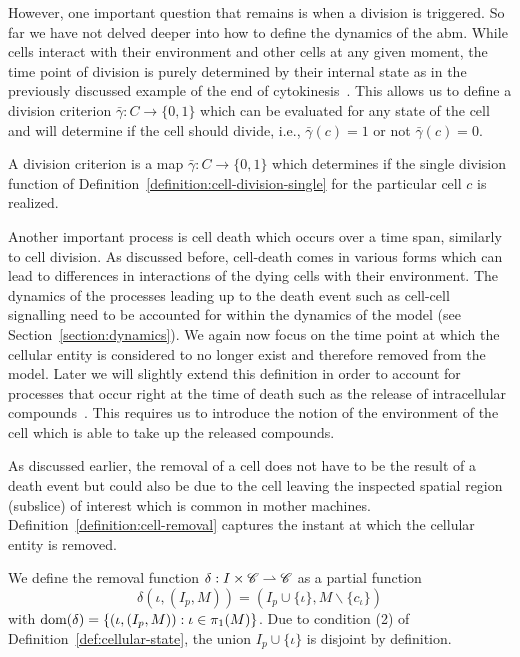 However, one important question that remains is when a division is triggered.
So far we have not delved deeper into how to define the dynamics of the \ac{abm}.
While cells interact with their environment and other cells at any given moment, the time point of
division is purely determined by their internal state as in the previously discussed example of
the end of cytokinesis~\cite{Gershony2014}.
This allows us to define a division criterion $\bar{\gamma}:C\rightarrow\{0,1\}$ which can be
evaluated for any state of the cell and will determine if the cell should divide, i.e.,
$\bar{\gamma}(c)=1$ or not $\bar{\gamma}(c)=0$.

\begin{definition}
    A division criterion is a map $\bar{\gamma}:C\rightarrow\{0,1\}$ which determines if the
    single division function of Definition~\ref{definition:cell-division-single} for the particular
    cell $c$ is realized.
    \label{definition:cell-division-criterion}
\end{definition}

Another important process is cell death which occurs over a time span, similarly to cell division.
As discussed before, cell-death comes in various forms which can lead to differences in interactions
of the dying cells with their environment.
The dynamics of the processes leading up to the death event such as cell-cell signalling need to be
accounted for within the dynamics of the model (see Section~\ref{section:dynamics}).
We again now focus on the time point at which the cellular entity is considered to no longer exist
and therefore removed from the model.
Later we will slightly extend this definition in order to account for processes that occur right at
the time of death such as the release of intracellular compounds~\cite{Kono2008,Chen2010}.
This requires us to introduce the notion of the environment of the cell which is able to take up the
released compounds.

As discussed earlier, the removal of a cell does not have to be the result of a death event but
could also be due to the cell leaving the inspected spatial region (subslice) of interest which is
common in mother machines.
Definition~\ref{definition:cell-removal} captures the instant at which the cellular entity is
removed.

\begin{definition}
    We define the removal function $\delta:I\times\mathscr{C}\rightharpoonup\mathscr{C}$ as a partial function
    \begin{equation}
        \delta(\iota, (I_p,M))=(I_p\cup\{\iota\},M\backslash\{c_\iota\})
    \end{equation}
    with $\text{\normalfont dom}(\delta)=\{(\iota,(I_p,M)):\iota\in\pi_1(M)\}$.
    Due to condition (2) of Definition~\ref{def:cellular-state}, the union $I_p\cup\{\iota\}$ is
    disjoint by definition.
    \label{definition:cell-removal}
\end{definition}

